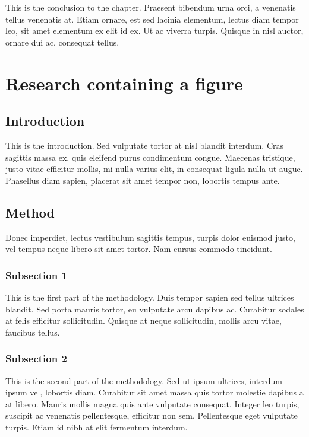 \documentclass[12pt,a4paper,]{report}
\begin{document}
This is the conclusion to the chapter. Praesent bibendum urna orci, a
venenatis tellus venenatis at. Etiam ornare, est sed lacinia elementum,
lectus diam tempor leo, sit amet elementum ex elit id ex. Ut ac viverra
turpis. Quisque in nisl auctor, ornare dui ac, consequat tellus.

\hypertarget{research-containing-a-figure}{%
\chapter{Research containing a
figure}\label{research-containing-a-figure}}

\hypertarget{introduction-2}{%
\section{Introduction}\label{introduction-2}}

This is the introduction. Sed vulputate tortor at nisl blandit interdum.
Cras sagittis massa ex, quis eleifend purus condimentum congue. Maecenas
tristique, justo vitae efficitur mollis, mi nulla varius elit, in
consequat ligula nulla ut augue. Phasellus diam sapien, placerat sit
amet tempor non, lobortis tempus ante.

\hypertarget{method-1}{%
\section{Method}\label{method-1}}

Donec imperdiet, lectus vestibulum sagittis tempus, turpis dolor euismod
justo, vel tempus neque libero sit amet tortor. Nam cursus commodo
tincidunt.

\hypertarget{subsection-1}{%
\subsection{Subsection 1}\label{subsection-1}}

This is the first part of the methodology. Duis tempor sapien sed tellus
ultrices blandit. Sed porta mauris tortor, eu vulputate arcu dapibus ac.
Curabitur sodales at felis efficitur sollicitudin. Quisque at neque
sollicitudin, mollis arcu vitae, faucibus tellus.

\hypertarget{subsection-2-1}{%
\subsection{Subsection 2}\label{subsection-2-1}}

This is the second part of the methodology. Sed ut ipsum ultrices,
interdum ipsum vel, lobortis diam. Curabitur sit amet massa quis tortor
molestie dapibus a at libero. Mauris mollis magna quis ante vulputate
consequat. Integer leo turpis, suscipit ac venenatis pellentesque,
efficitur non sem. Pellentesque eget vulputate turpis. Etiam id nibh at
elit fermentum interdum.
\end{document}
